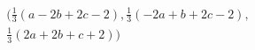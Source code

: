 \begin{multline*}
 \bigl( \frac{1}{3}(a-2b+2c-2),\frac{1}{3}(-2a+b+2c-2),\\
\frac{1}{3}(2a+2b+c+2)\bigr) 
\end{multline*}

